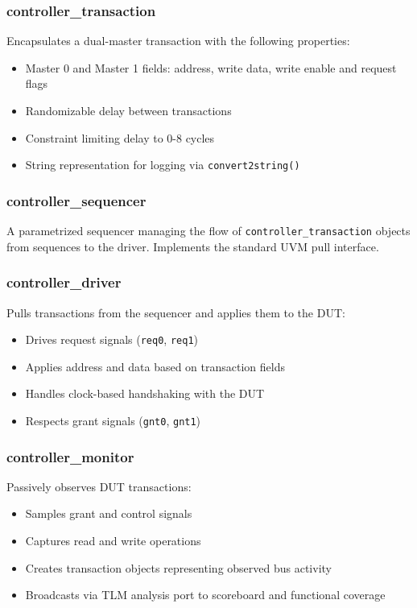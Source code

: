 \documentclass{article}
\begin{document}
\subsubsection{controller\_transaction}

Encapsulates a dual-master transaction with the following properties:
\begin{itemize}
    \item Master 0 and Master 1 fields: address, write data, write enable and request flags
    \item Randomizable delay between transactions
    \item Constraint limiting delay to 0-8 cycles
    \item String representation for logging via \texttt{convert2string()}
\end{itemize}

\subsubsection{controller\_sequencer}

A parametrized sequencer managing the flow of \texttt{controller\_transaction} objects from sequences to the driver. Implements the standard UVM pull interface.

\subsubsection{controller\_driver}

Pulls transactions from the sequencer and applies them to the DUT:
\begin{itemize}
    \item Drives request signals (\texttt{req0}, \texttt{req1})
    \item Applies address and data based on transaction fields
    \item Handles clock-based handshaking with the DUT
    \item Respects grant signals (\texttt{gnt0}, \texttt{gnt1})
\end{itemize}

\subsubsection{controller\_monitor}

Passively observes DUT transactions:
\begin{itemize}
    \item Samples grant and control signals
    \item Captures read and write operations
    \item Creates transaction objects representing observed bus activity
    \item Broadcasts via TLM analysis port to scoreboard and functional coverage
\end{itemize}
\end{document}
